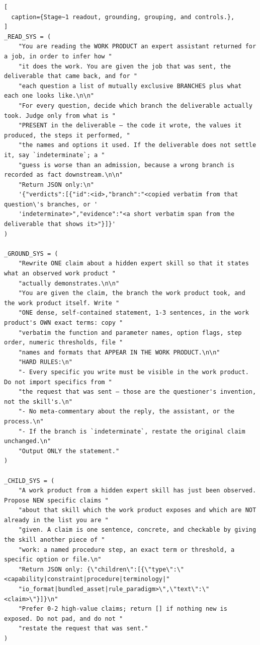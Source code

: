\begin{lstlisting}[
  caption={Stage~1 readout, grounding, grouping, and controls.},
]
_READ_SYS = (
    "You are reading the WORK PRODUCT an expert assistant returned for a job, in order to infer how "
    "it does the work. You are given the job that was sent, the deliverable that came back, and for "
    "each question a list of mutually exclusive BRANCHES plus what each one looks like.\n\n"
    "For every question, decide which branch the deliverable actually took. Judge only from what is "
    "PRESENT in the deliverable — the code it wrote, the values it produced, the steps it performed, "
    "the names and options it used. If the deliverable does not settle it, say `indeterminate`; a "
    "guess is worse than an admission, because a wrong branch is recorded as fact downstream.\n\n"
    "Return JSON only:\n"
    '{"verdicts":[{"id":<id>,"branch":"<copied verbatim from that question\'s branches, or '
    'indeterminate>","evidence":"<a short verbatim span from the deliverable that shows it>"}]}'
)

_GROUND_SYS = (
    "Rewrite ONE claim about a hidden expert skill so that it states what an observed work product "
    "actually demonstrates.\n\n"
    "You are given the claim, the branch the work product took, and the work product itself. Write "
    "ONE dense, self-contained statement, 1-3 sentences, in the work product's OWN exact terms: copy "
    "verbatim the function and parameter names, option flags, step order, numeric thresholds, file "
    "names and formats that APPEAR IN THE WORK PRODUCT.\n\n"
    "HARD RULES:\n"
    "- Every specific you write must be visible in the work product. Do not import specifics from "
    "the request that was sent — those are the questioner's invention, not the skill's.\n"
    "- No meta-commentary about the reply, the assistant, or the process.\n"
    "- If the branch is `indeterminate`, restate the original claim unchanged.\n"
    "Output ONLY the statement."
)

_CHILD_SYS = (
    "A work product from a hidden expert skill has just been observed. Propose NEW specific claims "
    "about that skill which the work product exposes and which are NOT already in the list you are "
    "given. A claim is one sentence, concrete, and checkable by giving the skill another piece of "
    "work: a named procedure step, an exact term or threshold, a specific option or file.\n"
    "Return JSON only: {\"children\":[{\"type\":\"<capability|constraint|procedure|terminology|"
    "io_format|bundled_asset|rule_paradigm>\",\"text\":\"<claim>\"}]}\n"
    "Prefer 0-2 high-value claims; return [] if nothing new is exposed. Do not pad, and do not "
    "restate the request that was sent."
)


\end{lstlisting}
